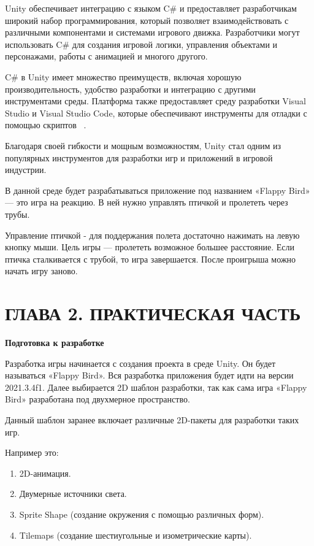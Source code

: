 \documentclass[14pt, oneside]{altsu-report}
\begin{document}
Unity обеспечивает интеграцию с языком C\# и предоставляет разработчикам широкий набор программирования, который позволяет взаимодействовать с различными компонентами и системами игрового движка. Разработчики могут использовать C\# для создания игровой логики, управления объектами и персонажами, работы с анимацией и многого другого. 

C\# в Unity имеет множество преимуществ, включая хорошую производительность, удобство разработки и интеграцию с другими инструментами среды. Платформа также предоставляет среду разработки Visual Studio и Visual Studio Code, которые обеспечивают инструменты для отладки с помощью скриптов ~\cite{Unity3, Unity4}. 

Благодаря своей гибкости и мощным возможностям, Unity стал одним из популярных инструментов для разработки игр и приложений в игровой индустрии.

В данной среде будет разрабатываться приложение под названием «Flappy Bird» — это игра на реакцию. В ней нужно управлять птичкой и пролететь через трубы.

Управление птичкой - для поддержания полета достаточно нажимать на левую кнопку мыши. Цель игры — пролететь возможное большее расстояние. Если птичка сталкивается с трубой, то игра завершается. После проигрыша можно начать игру заново.

\chapter{ГЛАВА 2. ПРАКТИЧЕСКАЯ ЧАСТЬ}

\textbf{Подготовка к разработке}

Разработка игры начинается с создания проекта в среде Unity. Он будет называться «Flappy Bird». Вся разработка приложения будет идти на версии 2021.3.4f1. Далее выбирается 2D шаблон разработки, так как сама игра «Flappy Bird» разработана под двухмерное пространство. 

Данный шаблон заранее включает различные 2D-пакеты для разработки таких игр. 

Например это: 

\begin{enumerate}
\item 2D-анимация.
\item Двумерные источники света.
\item Sprite Shape (создание окружения с помощью различных форм).
\item Tilemaps (создание шестиугольные и изометрические карты).
\end{enumerate} 
\end{document}
